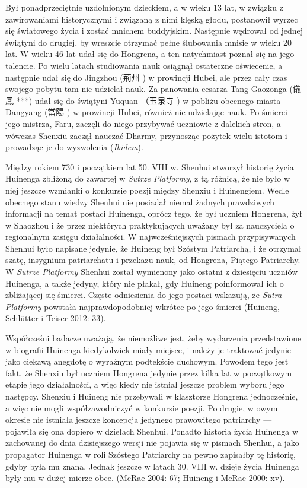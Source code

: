 Był ponadprzeciętnie uzdolnionym dzieckiem, a w wieku 13 lat, w związku z zawirowaniami historycznymi i związaną z nimi klęską głodu, postanowił wyrzec się światowego życia i zostać mnichem buddyjskim. Następnie wędrował od jednej świątyni do drugiej, by wreszcie otrzymać pełne ślubowania mnisie w wieku 20 lat. W wieku 46 lat udał się do Hongrena, a ten natychmiast poznał się na jego talencie. Po wielu latach studiowania nauk osiągnął ostateczne oświecenie, a następnie udał się do Jingzhou (荊州 ) w prowincji Hubei, ale przez cały czas swojego pobytu tam nie udzielał nauk. Za panowania cesarza Tang Gaozonga (儀鳳 ***) udał się do świątyni Yuquan （玉泉寺 ) w pobliżu obecnego miasta Dangyang (當陽 ) w prowincji Hubei, również nie udzielając nauk. Po śmierci jego mistrza, Faru, zaczęli do niego przybywać uczniowie z dalekich stron, a wówczas Shenxiu zaczął nauczać Dharmy, przynosząc pożytek wielu istotom i prowadząc je do wyzwolenia (\textit{Ibidem}). %

Między rokiem 730 i początkiem lat 50. VIII w. Shenhui stworzył historię życia Huinenga zbliżoną do zawartej w \textit{Sutrze Platformy}, z tą różnicą, że nie było w niej jeszcze wzmianki o konkursie poezji między Shenxiu i Huinengiem. Wedle obecnego stanu wiedzy Shenhui nie posiadał niemal żadnych prawdziwych informacji na temat postaci Huinenga, oprócz tego, że był uczniem Hongrena, żył w Shaozhou i że przez niektórych praktykujących uważany był za nauczyciela o regionalnym zasięgu działalności. W najwcześniejszych pismach przypisywanych Shenhui było napisane jedynie, że Huineng był Szóstym Patriarchą, i że otrzymał szatę, insygnium patriarchatu i przekazu nauk, od Hongrena, Piątego Patriarchy. W \textit{Sutrze Platformy} Shenhui został wymienony jako ostatni z dziesięciu uczniów Huinenga, a także jedyny, który nie płakał, gdy Huineng poinformował ich o zbliżającej się śmierci. Częste odniesienia do jego postaci wskazują, że \textit{Sutra Platformy} powstała najprawdopodobniej wkrótce po jego śmierci
(Huineng, Schlütter i Teiser 2012: 33).

Współcześni badacze uważają, że niemożliwe jest, żeby wydarzenia przedstawione w biografii Huinenga kiedykolwiek miały miejsce, i należy je traktować jedynie jako ciekawą anegdotę o wyraźnym podtekście duchowym. Powodem tego jest fakt, że Shenxiu był uczniem Hongrena jedynie przez kilka lat w początkowym etapie jego działalności, a więc kiedy nie istniał jeszcze problem wyboru jego następcy. Shenxiu i Huineng nie przebywali w klasztorze Hongrena jednocześnie, a więc nie mogli współzawodniczyć w konkursie poezji. Po drugie, w owym okresie nie istniała jeszcze koncepcja jedynego prawowitego patriarchy --- pojawiła się ona dopiero w dziełach Shenhui. Ponadto historia życia Huinenga w zachowanej do dnia dzisiejszego wersji nie pojawia się w pismach Shenhui, a jako propagator Huinenga w roli Szóstego Patriarchy na pewno zapisałby tę historię, gdyby była mu znana. Jednak jeszcze w latach 30. VIII w. dzieje życia Huinenga były mu w dużej mierze obce. (McRae 2004: 67; Huineng i McRae 2000: xv).

